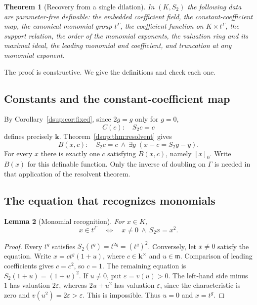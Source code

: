 \documentclass[11pt,oneside]{article}
\numberwithin{equation}{section}
\newtheorem{theorem}{Theorem}[section]
\newtheorem{lemma}[theorem]{Lemma}
\theoremstyle{definition}
\theoremstyle{remark}
\newcommand{\kk}{\mathbf k}
\newcommand{\mm}{\mathfrak m}
\newcommand{\eps}{\varepsilon}
\begin{document}
\begin{theorem}[Recovery from a single dilation]\label{dsup:thm:definability}
In $(K,S_2)$ the following data are parameter-free definable: the embedded
coefficient field, the constant-coefficient map, the canonical monomial
group $t^\Gamma$, the coefficient function on $K\times t^\Gamma$, the
support relation, the order of the monomial exponents, the valuation
ring and its maximal ideal, the leading monomial and coefficient, and
truncation at any monomial exponent.
\end{theorem}

The proof is constructive. We give the definitions and check each one.

\subsection{Constants and the constant-coefficient map}

By Corollary~\ref{dsup:cor:fixed}, since $2g=g$ only for $g=0$,
\begin{equation}\label{dsup:eq:defconstants}
 C(c):\quad S_2c=c
\end{equation}
defines precisely $\kk$. Theorem~\ref{dsup:thm:resolvent} gives
\begin{equation}\label{dsup:eq:constantformula}
 B(x,c):\quad S_2c=c\ \land\ \exists y\;(x-c=S_2y-y).
\end{equation}
For every $x$ there is exactly one $c$ satisfying $B(x,c)$, namely $[x]_0$.
Write $B(x)$ for this definable function. Only the inverse of doubling
on $\Gamma$ is needed in that application of the resolvent theorem.

\subsection{The equation that recognizes monomials}

\begin{lemma}[Monomial recognition]\label{dsup:lem:monomialrecognition}
For $x\in K$,
\begin{equation}\label{dsup:eq:monomialformula}
 x\in t^\Gamma\quad\Longleftrightarrow\quad x\ne0\ \land\ S_2x=x^2.
\end{equation}
\end{lemma}
\begin{proof}
Every $t^g$ satisfies $S_2(t^g)=t^{2g}=(t^g)^2$.
Conversely, let $x\ne0$ satisfy the equation. Write
$x=ct^g(1+u)$, where $c\in\kk^\times$ and $u\in\mm$. Comparison of
leading coefficients gives $c=c^2$, so $c=1$. The remaining equation is
$S_2(1+u)=(1+u)^2$. If $u\ne0$, put $\eps=v(u)>0$.
The left-hand side minus $1$ has valuation $2\eps$, whereas
$2u+u^2$ has valuation $\eps$, since the characteristic is zero and
$v(u^2)=2\eps>\eps$. This is impossible. Thus $u=0$ and $x=t^g$.
\end{proof}
\end{document}
